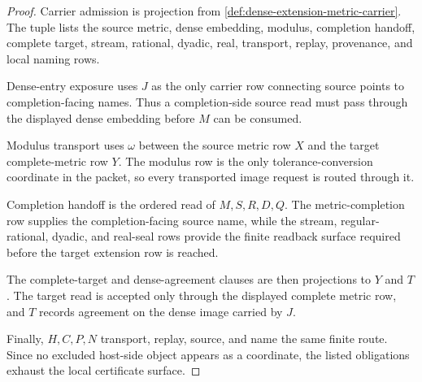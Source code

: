 \begin{proof}
Carrier admission is projection from \autoref{def:dense-extension-metric-carrier}. The tuple lists the source metric, dense embedding, modulus, completion handoff, complete target, stream, rational, dyadic, real, transport, replay, provenance, and local naming rows.

Dense-entry exposure uses $J$ as the only carrier row connecting source points to completion-facing names. Thus a completion-side source read must pass through the displayed dense embedding before $M$ can be consumed.

Modulus transport uses $\omega$ between the source metric row $X$ and the target complete-metric row $Y$. The modulus row is the only tolerance-conversion coordinate in the packet, so every transported image request is routed through it.

Completion handoff is the ordered read of $M,S,R,D,Q$. The metric-completion row supplies the completion-facing source name, while the stream, regular-rational, dyadic, and real-seal rows provide the finite readback surface required before the target extension row is reached.

The complete-target and dense-agreement clauses are then projections to $Y$ and $T$. The target read is accepted only through the displayed complete metric row, and $T$ records agreement on the dense image carried by $J$.

Finally, $H,C,P,N$ transport, replay, source, and name the same finite route. Since no excluded host-side object appears as a coordinate, the listed obligations exhaust the local certificate surface.
\end{proof}

